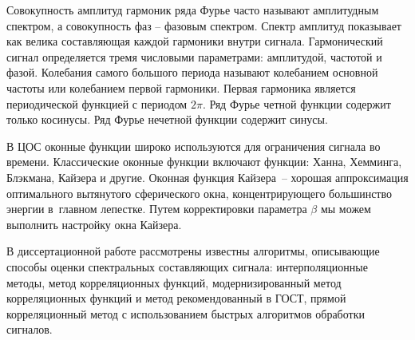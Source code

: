 

Совокупность амплитуд гармоник ряда Фурье часто называют амплитудным спектром, а совокупность фаз -- фазовым спектром. Спектр амплитуд показывает как велика составляющая каждой гармоники внутри сигнала. Гармонический сигнал определяется тремя числовыми параметрами: амплитудой, частотой и фазой. Колебания самого большого периода называют колебанием основной частоты или колебанием первой гармоники. Первая гармоника является периодической функцией с периодом $2 \pi$. Ряд Фурье четной функции содержит только косинусы. Ряд Фурье нечетной функции содержит синусы.

В ЦОС оконные функции широко используются для ограничения сигнала во времени. Классические оконные функции включают функции: Ханна, Хемминга, Блэкмана, Кайзера и другие. Оконная функция Кайзера – хорошая аппроксимация оптимального вытянутого сферического окна, концентрирующего большинство энергии в главном лепестке.
Путем корректировки параметра $\beta$ мы можем выполнить настройку окна
Кайзера.

В диссертационной работе рассмотрены известны алгоритмы, описывающие способы оценки спектральных составляющих сигнала: интерполяционные методы, метод корреляционных функций, модернизированный метод корреляционных функций и метод рекомендованный в ГОСТ, прямой корреляционный метод с использованием быстрых алгоритмов обработки сигналов. 

